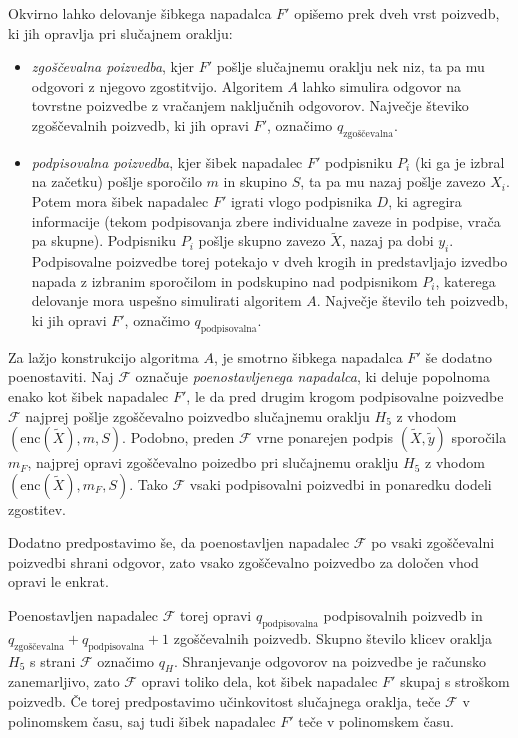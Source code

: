\begin{dokaz}
Okvirno lahko delovanje šibkega napadalca $F'$ opišemo prek dveh vrst poizvedb, ki jih opravlja pri
slučajnem oraklju:
\begin{itemize}
    \item \textit{zgoščevalna poizvedba}, kjer $F'$ pošlje slučajnemu oraklju nek niz, ta pa mu
        odgovori z njegovo zgostitvijo. Algoritem $A$ lahko simulira odgovor na tovrstne poizvedbe z
        vračanjem naključnih odgovorov. Največje števiko zgoščevalnih poizvedb, ki jih opravi $F'$,
        označimo $q_{\text{zgoščevalna}}$.
    \item \textit{podpisovalna poizvedba}, kjer šibek napadalec $F'$ podpisniku $P_i$ (ki ga je
        izbral na začetku) pošlje sporočilo $m$ in skupino $S$, ta pa mu nazaj pošlje zavezo $X_i$.
        Potem mora šibek napadalec $F'$ igrati vlogo podpisnika $D$, ki agregira informacije (tekom
        podpisovanja zbere individualne zaveze in podpise, vrača pa skupne). Podpisniku $P_i$ pošlje
        skupno zavezo $\tilde{X}$, nazaj pa dobi $y_i$. Podpisovalne poizvedbe torej potekajo v dveh
        krogih in predstavljajo izvedbo napada z izbranim sporočilom in podskupino nad podpisnikom
        $P_i$, katerega delovanje mora uspešno simulirati algoritem $A$. Največje število teh poizvedb,
        ki jih opravi $F'$, označimo $q_{\text{podpisovalna}}$.
\end{itemize}

Za lažjo konstrukcijo algoritma $A$, je smotrno šibkega napadalca $F'$ še dodatno poenostaviti. Naj $\mathcal{F}$ označuje
\textit{poenostavljenega napadalca}, ki deluje popolnoma enako kot šibek napadalec $F'$, le da pred
drugim krogom podpisovalne poizvedbe $\mathcal{F}$ najprej pošlje zgoščevalno poizvedbo slučajnemu
oraklju $H_5$ z vhodom $(\text{enc}(\tilde{X}), m, S)$. Podobno, preden $\mathcal{F}$ vrne ponarejen podpis
$(\tilde{X}, \tilde{y})$ sporočila $m_F$, najprej opravi zgoščevalno poizedbo pri slučajnemu oraklju
$H_5$ z vhodom $(\text{enc}(\tilde{X}), m_F, S)$. Tako $\mathcal{F}$ vsaki podpisovalni poizvedbi in ponaredku
dodeli zgostitev.

Dodatno predpostavimo še, da poenostavljen napadalec $\mathcal{F}$ po vsaki zgoščevalni poizvedbi
shrani odgovor, zato vsako zgoščevalno poizvedbo za določen vhod opravi le enkrat. 

Poenostavljen napadalec $\mathcal{F}$ torej opravi $q_{\text{podpisovalna}}$ podpisovalnih poizvedb
in $q_{\text{zgoščevalna}} + q_{\text{podpisovalna}} + 1$ zgoščevalnih poizvedb. Skupno število
klicev oraklja $H_5$ s strani $\mathcal{F}$ označimo $q_H$. Shranjevanje odgovorov na poizvedbe je
računsko zanemarljivo, zato $\mathcal{F}$ opravi toliko dela, kot šibek napadalec $F'$ skupaj s
stroškom poizvedb. Če torej predpostavimo učinkovitost slučajnega oraklja, teče $\mathcal{F}$ v
polinomskem času, saj tudi šibek napadalec $F'$ teče v polinomskem času.


\end{dokaz}
